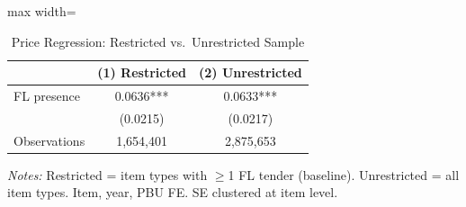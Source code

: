 \begin{table}[htbp]
\centering
\caption{Price Regression: Restricted vs.\ Unrestricted Sample}
\label{tab:unrestricted_sample}
\begin{adjustbox}{max width=\textwidth}
\begin{threeparttable}
\small
\begin{tabular}{lcc}
\toprule
 & (1) Restricted & (2) Unrestricted \\
\midrule
FL presence & 0.0636*** & 0.0633*** \\
 & (0.0215) & (0.0217) \\
\midrule
Observations & 1,654,401 & 2,875,653 \\
\bottomrule
\end{tabular}
\begin{tablenotes}
\small
\item \textit{Notes:} Restricted = item types with $\geq$1 FL tender (baseline).
Unrestricted = all item types. Item, year, PBU FE. SE clustered at item level.
\end{tablenotes}
\end{threeparttable}
\end{adjustbox}
\end{table}
